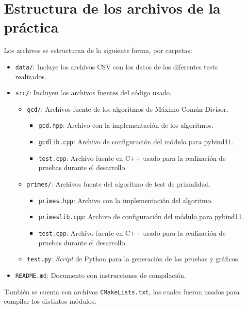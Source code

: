 \appendix
\section{Estructura de los archivos de la práctica}

Los archivos se estructuran de la siguiente forma, por carpetas:
\begin{itemize}
    \item \texttt{data/}: Incluye los archivos CSV con los datos de los diferentes tests realizados.
    \item \texttt{src/}: Incluyen los archivos fuentes del código usado.
    \begin{itemize}
        \item \texttt{gcd/}: Archivos fuente de los algoritmos de Máximo Común Divisor.
        \begin{itemize}
            \item \texttt{gcd.hpp}: Archivo con la implementación de los algoritmos.
            \item \texttt{gcdlib.cpp}: Archivo de configuración del módulo para pybind11.
            \item \texttt{test.cpp}: Archivo fuente en C++ usado para la realización de pruebas durante el desarrollo.
        \end{itemize}
        \item \texttt{primes/}: Archivos fuente del algoritmo de test de primalidad.
        \begin{itemize}
            \item \texttt{primes.hpp}: Archivo con la implementación del algoritmo.
            \item \texttt{primeslib.cpp}: Archivo de configuración del módulo para pybind11.
            \item \texttt{test.cpp}: Archivo fuente en C++ usado para la realización de pruebas durante el desarrollo.
        \end{itemize}
        \item \texttt{test.py}: \textit{Script} de Python para la generación de las pruebas y gráficos.
    \end{itemize}
    \item \texttt{README.md}: Documento con instrucciones de compilación.
\end{itemize}

También se cuenta con archivos \texttt{CMakeLists.txt}, los cuales fueron usados para compilar los distintos módulos.
